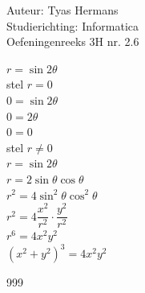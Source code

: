 \documentclass[a4paper]{article}
\begin{document}
  
\noindent \large Auteur: Tyas Hermans \\
\noindent \large Studierichting: Informatica\\
\noindent \large Oefeningenreeks 3H nr. 2.6\\

\medskip

\normalsize

$r = \sin2\theta$\\

stel $r=0$\\

$0 = \sin2\theta$\\

$0 = 2\theta$\\

$0= 0$\\

stel $r\neq0$\\

$r = \sin2\theta$\\

$r=2\sin\theta\cos\theta$\\

$r^2 = 4\sin^2\theta\cos^2\theta$\\

$r^2 = 4\dfrac{x^2}{r^2}\cdot\dfrac{y^2}{r^2}$\\

$r^6 = 4x^2y^2$\\

$\left(x^2+y^2\right)^3 = 4x^2y^2$\\



\begin{thebibliography}{999}
\end{thebibliography}
\end{document}
